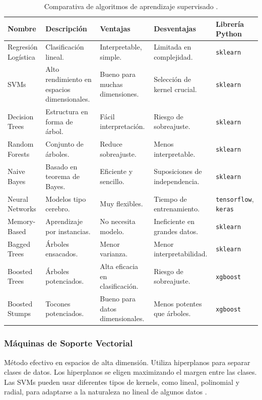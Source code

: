 \begin{table}[h]
\centering
\tiny
\begin{tabular}{|l|p{2cm}|p{2.5cm}|p{2.5cm}|p{1.5cm}|}
\hline
\rowcolor{azulclaro}
\textbf{Nombre} & \textbf{Descripción} & \textbf{Ventajas} & \textbf{Desventajas} & \textbf{Librería Python} \\ \hline
Regresión Logística & Clasificación lineal. & Interpretable, simple. & Limitada en complejidad. & \texttt{sklearn} \\ \hline
SVMs & Alto rendimiento en espacios dimensionales. & Bueno para muchas dimensiones. & Selección de kernel crucial. & \texttt{sklearn} \\ \hline
Decision Trees & Estructura en forma de árbol. & Fácil interpretación. & Riesgo de sobreajuste. & \texttt{sklearn} \\ \hline
Random Forests & Conjunto de árboles. & Reduce sobreajuste. & Menos interpretable. & \texttt{sklearn} \\ \hline
Naive Bayes & Basado en teorema de Bayes. & Eficiente y sencillo. & Suposiciones de independencia. & \texttt{sklearn} \\ \hline
Neural Networks & Modelos tipo cerebro. & Muy flexibles. & Tiempo de entrenamiento. & \texttt{tensorflow}, \texttt{keras} \\ \hline
Memory-Based & Aprendizaje por instancias. & No necesita modelo. & Ineficiente en grandes datos. & \texttt{sklearn} \\ \hline
Bagged Trees & Árboles ensacados. & Menor varianza. & Menor interpretabilidad. & \texttt{sklearn} \\ \hline
Boosted Trees & Árboles potenciados. & Alta eficacia en clasificación. & Riesgo de sobreajuste. & \texttt{xgboost} \\ \hline
Boosted Stumps & Tocones potenciados. & Bueno para datos dimensionales. & Menos potentes que árboles. & \texttt{xgboost} \\ \hline
\end{tabular}
  \caption{Comparativa de algoritmos de aprendizaje supervisado \cite{10.1145/1143844.1143865}.}
\label{table:comparativa-algoritmos-supervisado}
\end{table}

\subsubsection{Máquinas de Soporte Vectorial}
Método efectivo en espacios de alta dimensión. Utiliza hiperplanos para separar
clases de datos. Los hiperplanos se eligen maximizando el margen entre las clases.
Las SVMs pueden usar diferentes tipos de kernels, como lineal, polinomial y
radial, para adaptarse a la naturaleza no lineal de algunos datos \cite{10.1145/1143844.1143865}.

